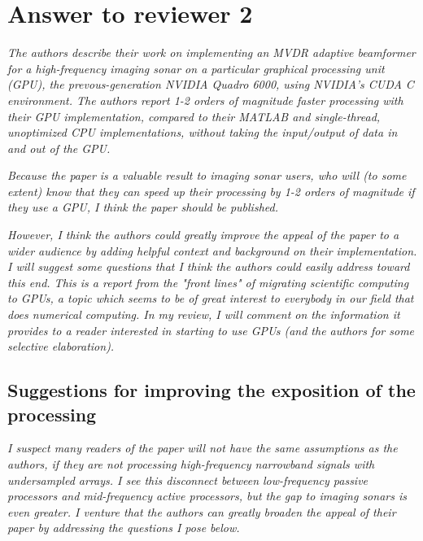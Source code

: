 \documentclass[11pt]{article} %
\newcommand\1{\vec 1}
\newcommand\q[1]{\textit{#1}}
\begin{document}
\newpage
\section{Answer to reviewer 2}

\q{The authors describe their work on implementing an MVDR adaptive beamformer for a high-frequency imaging sonar on a particular graphical processing unit (GPU), the prevous-generation NVIDIA Quadro 6000, using NVIDIA's CUDA C environment. The authors report 1-2 orders of magnitude faster processing with their GPU implementation, compared to their MATLAB and single-thread, unoptimized CPU implementations, without taking the input/output of data in and out of the GPU.}

\q{Because the paper is a valuable result to imaging sonar users, who will (to some extent) know that they can speed up their processing by 1-2 orders of magnitude if they use a GPU, I think the paper should be published.}

\q{However, I think the authors could greatly improve the appeal of the paper to a wider audience by adding helpful context and background on their implementation. I will suggest some questions that I think the authors could easily address toward this end. This is a report from the "front lines" of migrating scientific computing to GPUs, a topic which seems to be of great interest to everybody in our field that does numerical computing. In my review, I will comment on the information it provides to a reader interested in starting to use GPUs (and the authors for some selective elaboration).}

\subsection*{Suggestions for improving the exposition of the processing}

\q{I suspect many readers of the paper will not have the same assumptions as the authors, if they are not processing high-frequency narrowband signals with undersampled arrays. I see this disconnect between low-frequency passive processors and mid-frequency active processors, but the gap to imaging sonars is even greater. I venture that the authors can greatly broaden the appeal of their paper by addressing the questions I pose below.}
\end{document}

